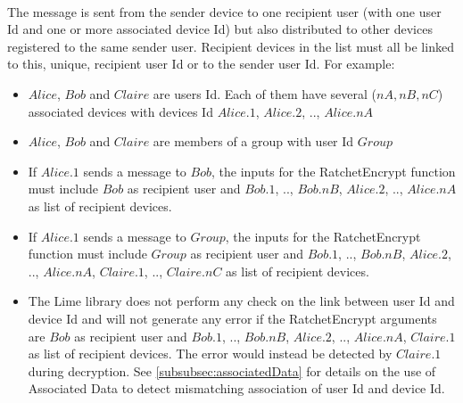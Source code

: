 \documentclass[a4paper,11pt]{article}
\begin{document}
      \paragraph{}The message is sent from the sender device to one recipient user (with one user Id and one or more associated device Id) but also distributed to other devices registered to the same sender user. Recipient devices in the list must all be linked to this, unique, recipient user Id or to the sender user Id. For example:
      \begin{itemize}
        \item $Alice$, $Bob$ and $Claire$ are users Id. Each of them have several ($nA, nB, nC$) associated devices with devices Id $Alice.1$, $Alice.2$, .., $Alice.nA$
        \item $Alice$, $Bob$ and $Claire$ are members of a group with user Id $Group$
        \item If $Alice.1$ sends a message to $Bob$, the inputs for the RatchetEncrypt function must include $Bob$ as recipient user and $Bob.1$, .., $Bob.nB$, $Alice.2$, .., $Alice.nA$ as list of recipient devices.
        \item If $Alice.1$ sends a message to $Group$, the inputs for the RatchetEncrypt function must include $Group$ as recipient user and $Bob.1$, .., $Bob.nB$, $Alice.2$, .., $Alice.nA$, $Claire.1$, .., $Claire.nC$ as list of recipient devices.
        \item The Lime library does not perform any check on the link between user Id and device Id and will not generate any error if the RatchetEncrypt arguments are $Bob$ as recipient user and $Bob.1$, .., $Bob.nB$, $Alice.2$, .., $Alice.nA$, $Claire.1$ as list of recipient devices. The error would instead be detected by $Claire.1$ during decryption. See \ref{subsubsec:associatedData} for details on the use of Associated Data to detect mismatching association of user Id and device Id.
      \end{itemize}
\end{document}
